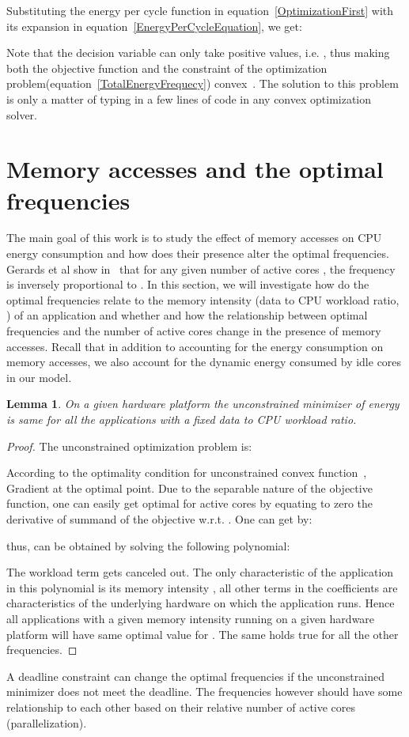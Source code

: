 \documentclass[11pt, letterpaper]{article}
\newtheorem{lemma}{Lemma}
\begin{document}
Substituting the energy per cycle function  in equation~\ref{OptimizationFirst} with its expansion in equation~\ref{EnergyPerCycleEquation}, we get:

 Note that the decision variable  can only take positive values, i.e. , thus making both the objective function and the constraint of the optimization problem(equation~\ref{TotalEnergyFrequecy}) convex~\cite{Boyd}. The solution to this problem is only a matter of typing in a few lines of code in any convex optimization solver.
\section{Memory accesses and the optimal frequencies}\label{AffectMemoryAccesses}
 The main goal of this work is to study the effect of memory accesses on CPU energy consumption and how does their presence alter the optimal frequencies. 
Gerards et al show in~\cite{ConvexAndScheduling} that for any given number of active cores , the frequency  is inversely proportional to . In this section, we will investigate how do the optimal frequencies relate to the memory intensity (data to CPU workload ratio, ) of an application and whether and how the relationship between optimal frequencies and the number of active cores change in the presence of memory accesses. Recall that in addition to  accounting for the energy consumption on memory accesses, we also account for the dynamic energy consumed by idle cores in our model.
 
 \begin{lemma}\label{UnconstrainedOptimization}
  On a given hardware platform the unconstrained minimizer  of energy is same for all the applications with a fixed data to CPU workload ratio.
 \end{lemma}
\begin{proof}
The unconstrained optimization problem is:
 
According to the optimality condition for unconstrained convex function~\cite{Boyd}, Gradient  at the optimal point. Due to the separable nature of the objective function, one can easily get optimal  for  active cores by equating to zero the derivative of  summand of the objective w.r.t. .
 One can get  by: 
 
 
 thus,  can be obtained by solving the following polynomial:
  
 The workload term  gets canceled out. The only characteristic of the application in this polynomial is its memory intensity , all other terms in the coefficients are characteristics of the underlying hardware on which the application runs. Hence all applications with a given memory intensity  running on a given hardware platform will have same optimal value for . The same holds true for all the other frequencies.
\end{proof}
A deadline constraint can change the optimal frequencies if the unconstrained minimizer does not meet the deadline. The frequencies however should have some relationship to each other based on their relative number of active cores (parallelization).
\end{document}
